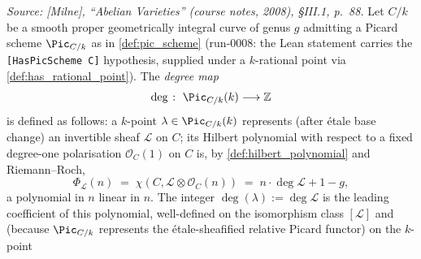 \begin{definition}

  \label{def:divisor_degree_pic}

  \textit{Source: [Milne], ``Abelian Varieties'' (course notes, 2008),
  \S III.1, p.~88.}
  Let \(C/k\) be a smooth proper geometrically integral curve of genus
  \(g\) admitting a Picard scheme \(\Pic_{C/k}\) as in
  \cref{def:pic_scheme} (run-0008: the Lean statement carries the
  \texttt{[HasPicScheme C]} hypothesis, supplied under a \(k\)-rational
  point via \cref{def:has_rational_point}). The \emph{degree map}
  \[
    \deg \;\colon\; \Pic_{C/k}(k) \longrightarrow \mathbb{Z}
  \]
  is defined as follows: a \(k\)-point \(\lambda \in \Pic_{C/k}(k)\)
  represents (after \'etale base change) an invertible sheaf
  \(\mathcal{L}\) on \(C\); its Hilbert polynomial with respect to a fixed
  degree-one polarisation \(\mathcal{O}_C(1)\) on \(C\) is, by
  \cref{def:hilbert_polynomial} and Riemann--Roch,
  \[
    \Phi_{\mathcal{L}}(n)
    \;=\; \chi(C, \mathcal{L} \otimes \mathcal{O}_C(n))
    \;=\; n \cdot \deg \mathcal{L} + 1 - g,
  \]
  a polynomial in \(n\) linear in \(n\). The integer
  \(\deg(\lambda) := \deg \mathcal{L}\) is the leading coefficient of
  this polynomial, well-defined on the isomorphism class
  \([\mathcal{L}]\) and (because \(\Pic_{C/k}\) represents the
  \'etale-sheafified relative Picard functor) on the \(k\)-point

\end{definition}
